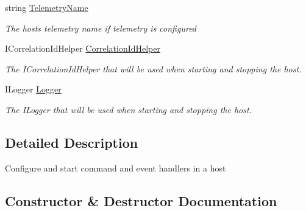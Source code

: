 \begin{DoxyCompactItemize}
string \hyperlink{classCqrs_1_1Hosts_1_1CoreHost_a098b8ab87f83dd6519e36b9838fd6e2e_a098b8ab87f83dd6519e36b9838fd6e2e}{Telemetry\+Name}
\begin{DoxyCompactList}\small\item\em The hosts telemetry name if telemetry is configured \end{DoxyCompactList}\item 
I\+Correlation\+Id\+Helper \hyperlink{classCqrs_1_1Hosts_1_1CoreHost_ac67d2efe8657b335feb997a0dd5aa6b0_ac67d2efe8657b335feb997a0dd5aa6b0}{Correlation\+Id\+Helper}
\begin{DoxyCompactList}\small\item\em The I\+Correlation\+Id\+Helper that will be used when starting and stopping the host. \end{DoxyCompactList}\item 
I\+Logger \hyperlink{classCqrs_1_1Hosts_1_1CoreHost_a7eca7bf35000d2c5b41b88b636907be3_a7eca7bf35000d2c5b41b88b636907be3}{Logger}
\begin{DoxyCompactList}\small\item\em The I\+Logger that will be used when starting and stopping the host. \end{DoxyCompactList}\end{DoxyCompactItemize}


\subsection{Detailed Description}
Configure and start command and event handlers in a host 



\subsection{Constructor \& Destructor Documentation}
\mbox{\label{classCqrs_1_1Hosts_1_1CoreHost_aa1f88ad96bd3f1680e18550299cd6f69_aa1f88ad96bd3f1680e18550299cd6f69}} 
